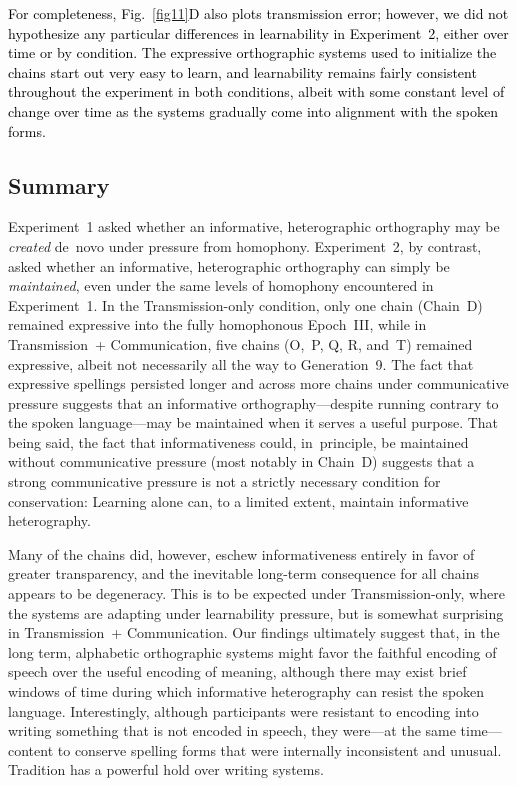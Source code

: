 \documentclass[doc,biblatex]{apa7}
\newcommand\newmaterial[1]{\textcolor{black}{#1}}
\begin{document}
\newmaterial{For completeness, Fig.~\ref{fig11}D also plots transmission error; however, we did not hypothesize any particular differences in learnability in Experiment~2, either over time or by condition. The expressive orthographic systems used to initialize the chains start out very easy to learn, and learnability remains fairly consistent throughout the experiment in both conditions, albeit with some constant level of change over time as the systems gradually come into alignment with the spoken forms.}

\subsection{Summary}

Experiment~1 asked whether an informative, heterographic orthography may be \textit{created} de~novo under pressure from homophony. Experiment~2, by contrast, asked whether an informative, heterographic orthography can simply be \textit{maintained}, even under the same levels of homophony encountered in Experiment~1. In the Transmission-only condition, only one chain (Chain~D) remained expressive into the fully homophonous Epoch~III, while in Transmission~+ Communication, five chains (O,~P, Q, R, and~T) remained expressive, albeit not necessarily all the way to Generation~9. The fact that expressive spellings persisted longer and across more chains under communicative pressure suggests that an informative orthography---despite running contrary to the spoken language---may be maintained when it serves a useful purpose. That being said, the fact that informativeness could, in~principle, be maintained without communicative pressure (most notably in Chain~D) suggests that a strong communicative pressure is not a strictly necessary condition for conservation: Learning alone can, to a limited extent, maintain informative heterography.

Many of the chains did, however, eschew informativeness entirely in favor of greater transparency, and the inevitable long-term consequence for all chains appears to be degeneracy. This is to be expected under Transmission-only, where the systems are adapting under learnability pressure, but is somewhat surprising in Transmission~+ Communication. Our findings ultimately suggest that, in the long term, alphabetic orthographic systems might favor the faithful encoding of speech over the useful encoding of meaning, although there may exist brief windows of time during which informative heterography can resist the spoken language. Interestingly, although participants were resistant to encoding into writing something that is not encoded in speech, they were---at the same time---content to conserve spelling forms that were internally inconsistent and unusual. Tradition has a powerful hold over writing systems.
\end{document}
